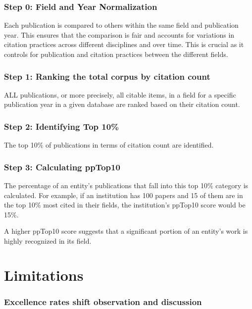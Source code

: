 \documentclass[
  letterpaper,
]{scrreprt}
\begin{document}
\subsubsection{Step 0: Field and Year
Normalization}\label{step-0-field-and-year-normalization}

Each publication is compared to others within the same field and
publication year. This ensures that the comparison is fair and accounts
for variations in citation practices across different disciplines and
over time. This is crucial as it controls for publication and citation
practices between the different fields.

\subsubsection{Step 1: Ranking the total corpus by citation
count}\label{step-1-ranking-the-total-corpus-by-citation-count}

ALL publications, or more precisely, all citable items, in a field for a
specific publication year in a given database are ranked based on their
citation count.

\subsubsection{Step 2: Identifying Top
10\%}\label{step-2-identifying-top-10}

The top 10\% of publications in terms of citation count are identified.

\subsubsection{Step 3: Calculating
ppTop10}\label{step-3-calculating-pptop10}

The percentage of an entity's publications that fall into this top 10\%
category is calculated. For example, if an institution has 100 papers
and 15 of them are in the top 10\% most cited in their fields, the
institution's ppTop10 score would be 15\%.

A higher ppTop10 score suggests that a significant portion of an
entity's work is highly recognized in its field.

\section{Limitations}\label{limitations-9}

\subsubsection{Excellence rates shift observation and
discussion}\label{excellence-rates-shift-observation-and-discussion}
\end{document}
